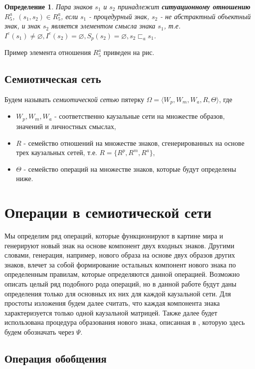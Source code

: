 \documentclass[12pt]{scrartcl}
\newtheorem{definition}{Определение}
\begin{document}
	\begin{definition}
		Пара знаков $s_1$ и $s_2$ принадлежит \textbf{ситуационному отношению} $R_5^a$, $(s_1,s_2)\in R_5^a$, если $s_1$ - процедурный знак, $s_2$ - не абстрактный объектный знак, и знак $s_2$ является элементом смысла знака $s_1$, т.е. $I^e(s_1)\not = \varnothing, I^e(s_2) = \varnothing, S_p(s_2)=\varnothing, s_2\sqsubset_a s_1$.
	\end{definition}
	
	Пример элемента отношения $R_5^a$ приведен на рис.
		
	\subsection{Семиотическая сеть}
	Будем называть \textit{семиотической сетью} пятерку $\Omega=\langle W_p, W_m, W_a, R, \Theta \rangle$, где
	\begin{itemize}
		\item $W_p, W_m, W_a$ - соответственно каузальные сети на множестве образов, значений и личностных смыслах,
		\item $R$ - семейство отношений на множестве знаков, сгенерированных на основе трех каузальных сетей, т.е. $R=\{R^p, R^m, R^a\}$,
		\item $\Theta$ - семейство операций на множестве знаков, которые будут определены ниже.
	\end{itemize} 
	

	\section{Операции в семиотической сети}
	Мы определим ряд операций, которые функционируют в картине мира и генерируют новый знак на основе компонент двух входных знаков. Другими словами, генерация, например, нового образа на основе двух образов других знаков, влечет за собой формирование остальных компонент нового знака по определенным правилам, которые определяются данной операцией. Возможно описать целый ряд подобного рода операций, но в данной работе будут даны определения только для основных их них для каждой каузальной сети. Для простоты изложения будем далее считать, что каждая компонента знака характеризуется только одной каузальной матрицей. Также далее будет использована процедура образования нового знака, описанная в \cite{Osipov2014c}, которую здесь будем обозначать через $\Psi$.
	
	\subsection{Операция обобщения}
	
\end{document}
